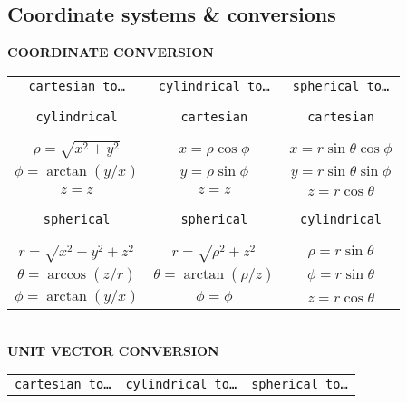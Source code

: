 \documentclass[letterpaper,landscape,10pt]{article}
\begin{document}
{\begin{multicols}{3}
	\subsection*{Coordinate systems \& conversions}
	\begin{center}\textbf{COORDINATE CONVERSION}\\
	\begin{tabular}{ c c c }
		\texttt{cartesian to\dots} & \texttt{cylindrical to\dots} &
			\texttt{spherical to\dots} \\
		\vspace{.5pt}\\
		\hline
		\vspace{.5pt}\\
		\texttt{cylindrical}    & \texttt{cartesian} & \texttt{cartesian} \\
		\vspace{.5pt}\\
		\hline
		\vspace{.5pt}\\
		$\rho=\sqrt{x^2+y^2}$ & $x=\rho\cos\phi$ & $x=r\sin\theta\cos\phi$ \\
		$\phi=\arctan(y/x)$    & $y=\rho\sin\phi$ & $y=r\sin\theta\sin\phi$ \\
		$z = z$               & $z=z$            & $z=r\cos\theta$\vspace{2pt}\\
		
		\vspace{.5pt}\\
		\hline
		\vspace{.5pt}\\
		\texttt{spherical}      & \texttt{spherical} & \texttt{cylindrical} \\
		\vspace{.5pt}\\
		\hline
		\vspace{.5pt}\\
		
		$r=\sqrt{x^2+y^2+z^2}$& $r=\sqrt{\rho^2+z^2}$&$\rho=r\sin\theta$ \\
		$\theta=\arccos(z/r)$  & $\theta=\arctan(\rho/z)$&$\phi=r\sin\theta$ \\
		$\phi=\arctan(y/x)$    & $\phi=\phi$      & $z=r\cos\theta$ \\
	\end{tabular} \vspace{4pt}\\

	\textbf{UNIT VECTOR CONVERSION}
	\begin{tabular}{ c c c }
		\texttt{cartesian to\dots} & \texttt{cylindrical to\dots} &
			\texttt{spherical to\dots} \\


\end{tabular}
\end{center}
\end{multicols}}
\end{document}
